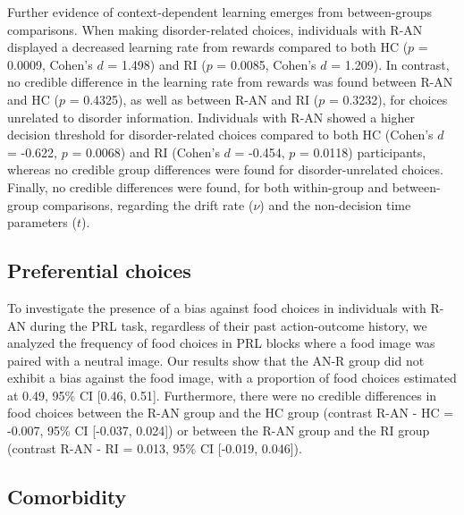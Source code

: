 \documentclass[
  man,floatsintext]{apa6}
\begin{document}
Further evidence of context-dependent learning emerges from between-groups comparisons. When making disorder-related choices, individuals with R-AN displayed a decreased learning rate from rewards compared to both HC (\(p\) = 0.0009, Cohen's \(d\) = 1.498) and RI (\(p\) = 0.0085, Cohen's \(d\) = 1.209). In contrast, no credible difference in the learning rate from rewards was found between R-AN and HC (\(p\) = 0.4325), as well as between R-AN and RI (\(p\) = 0.3232), for choices unrelated to disorder information. Individuals with R-AN showed a higher decision threshold for disorder-related choices compared to both HC (Cohen's \(d\) = -0.622, \(p\) = 0.0068) and RI (Cohen's \(d\) = -0.454, \(p\) = 0.0118) participants, whereas no credible group differences were found for disorder-unrelated choices. Finally, no credible differences were found, for both within-group and between-group comparisons, regarding the drift rate (\(\nu\)) and the non-decision time parameters (\(t\)).

\hypertarget{preferential-choices}{%
\subsection{Preferential choices}\label{preferential-choices}}

To investigate the presence of a bias against food choices in individuals with R-AN during the PRL task, regardless of their past action-outcome history, we analyzed the frequency of food choices in PRL blocks where a food image was paired with a neutral image. Our results show that the AN-R group did not exhibit a bias against the food image, with a proportion of food choices estimated at 0.49, 95\% CI {[}0.46, 0.51{]}. Furthermore, there were no credible differences in food choices between the R-AN group and the HC group (contrast R-AN - HC = -0.007, 95\% CI {[}-0.037, 0.024{]}) or between the R-AN group and the RI group (contrast R-AN - RI = 0.013, 95\% CI {[}-0.019, 0.046{]}).

\hypertarget{comorbidity}{%
\subsection{Comorbidity}\label{comorbidity}}
\end{document}

